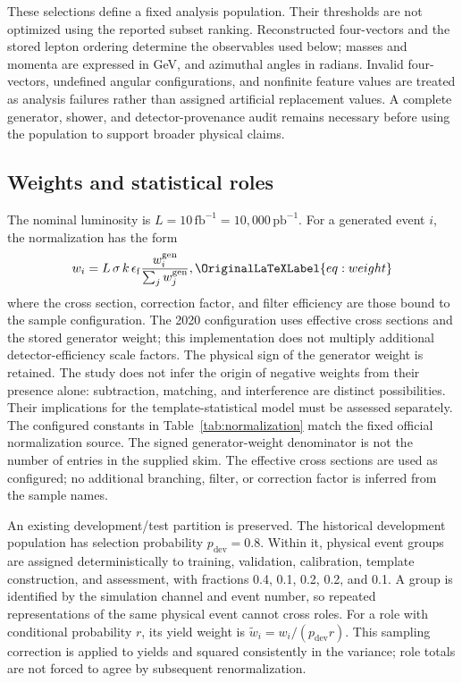 \documentclass[aps,prd,reprint,superscriptaddress,nofootinbib,longbibliography,floatfix]{revtex4-2}
\let\label\OriginalLaTeXLabel
\begin{document}
These selections define a fixed analysis population. Their thresholds are
not optimized using the reported subset ranking. Reconstructed four-vectors
and the stored lepton ordering determine the observables used below; masses
and momenta are expressed in GeV, and azimuthal angles in radians. Invalid
four-vectors, undefined angular configurations, and nonfinite feature values
are treated as analysis failures rather than assigned artificial replacement
values. A complete generator, shower, and detector-provenance audit remains
necessary before using the population to support broader physical claims.

\subsection{Weights and statistical roles}

The nominal luminosity is $L=10\,\mathrm{fb}^{-1}=10{,}000\,\mathrm{pb}^{-1}$.
For a generated event $i$,
the normalization has the form
\begin{equation}
 w_i=L\,\sigma\,k\,\epsilon_{\mathrm f}
          \frac{w_i^{\mathrm{gen}}}{\sum_j w_j^{\mathrm{gen}}},
 \label{eq:weight}
\end{equation}
where the cross section, correction factor, and filter efficiency are those
bound to the sample configuration. The 2020 configuration uses effective
cross sections and the stored generator weight; this implementation does
not multiply additional detector-efficiency scale factors. The physical
sign of the generator weight is retained. The study does not infer the origin of negative weights from
their presence alone: subtraction, matching, and interference are distinct
possibilities. Their implications for the template-statistical model must be
assessed separately\cite{Mandrik2017,Gluesenkamp2018}.
The configured constants in Table~\ref{tab:normalization} match the fixed
official normalization source\cite{ATLASNormalization}. The signed
generator-weight denominator is not the number of entries in the supplied
skim. The effective cross sections are used as configured; no additional
branching, filter, or correction factor is inferred from the sample names.

An existing development/test partition is preserved. The historical
development population has selection probability $p_{\mathrm{dev}}=0.8$.
Within it, physical event groups are assigned deterministically to training,
validation, calibration, template construction, and assessment, with fractions
0.4, 0.1, 0.2, 0.2, and 0.1. A group is identified by the simulation channel
and event number, so repeated representations of the same physical event
cannot cross roles. For a role with conditional probability $r$, its yield
weight is $\widetilde w_i=w_i/(p_{\mathrm{dev}}r)$. This sampling correction
is applied to yields and squared consistently in the variance; role totals
are not forced to agree by subsequent renormalization.
\end{document}
